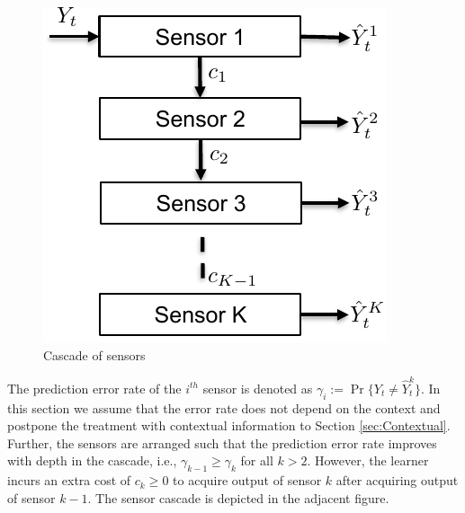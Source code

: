 \documentclass{article}
\begin{document}
\begin{figure}
	\vspace{-.5cm}
	\centering
	\includegraphics[scale=.6]{SensorCascade.pdf}
	\caption{Cascade of sensors}\label{wrap-fig:1}
    \vspace{-.5cm}
\end{figure} 

The prediction error rate of the $i^{th}$ sensor is denoted as $\gamma_i:=\Pr\{Y_t\neq \hat{Y}^k_t\}$. In this section we assume that the error rate does not depend on the  context and postpone the treatment with contextual information to Section \ref{sec:Contextual}. Further, the sensors are arranged such that the prediction error rate improves with depth in the cascade, i.e., $\gamma_{k-1}\geq \gamma_k$ for all $k>2$. However, the learner incurs an extra cost of $c_k\geq 0$ to acquire output of sensor $k$ after acquiring output of sensor $k-1$. The sensor cascade is depicted in the adjacent figure.
\end{document}
